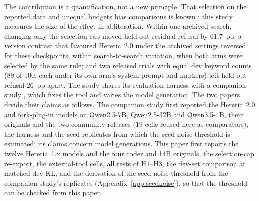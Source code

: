 The contribution is a quantification, not a new principle. That selection on the reported data and unequal budgets
bias comparisons is known \cite{cawley2010overfitting,dodge2019show}; this study measures the size of the effect in
abliteration. Within one archived search, changing only the selection cap moved held-out residual refusal by 61.7~pp;
a version contrast that favoured Heretic~2.0 under the archived settings reversed for these checkpoints, within
search-to-search variation, when both arms were selected by the same rule; and two released trials with equal dev
keyword counts (89 of 100, each under its own arm's system prompt and markers) left held-out refusal 26~pp apart. The
study shares its evaluation harness with a companion study \cite{young2026harder}, which fixes the tool and varies the
model generation. The two papers divide their claims as follows. The companion study first reported the Heretic~2.0
and fork-plug-in models on Qwen2.5-7B, Qwen2.5-32B and Qwen3.5-4B, their originals and the two community releases (19
cells reused here as comparators), the harness and the seed replicates from which the seed-noise threshold is
estimated; its claims concern model generations. This paper first reports the twelve Heretic~1.x models and the four
coder and 14B originals, the selection-cap re-export, the external-tool cells, all tests of H1--H3, the dev-set
comparison at matched dev KL, and the derivation of the seed-noise threshold from the companion study's replicates
(Appendix~\ref{app:seednoise}), so that the threshold can be checked from this paper.
